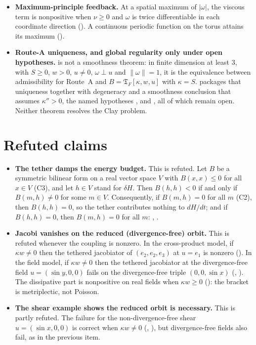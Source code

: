 \documentclass[11pt]{article}
\begin{document}
\begin{itemize}
\item \textbf{Maximum-principle feedback.} At a spatial maximum of $|\omega|$, the viscous term is nonpositive when $\nu\ge0$ and $\omega$ is twice differentiable in each coordinate direction (). A continuous periodic function on the torus attains its maximum ().
\item \textbf{Route-A uniqueness, and global regularity only under open hypotheses.}  is not a smoothness theorem: in finite dimension at least $3$, with $S\ge0$, $w>0$, $u\neq0$, $\omega\perp u$ and $\|\omega\|=1$, it is the equivalence between admissibility for Route~A and $B=\mathfrak{T}_F[\kappa,w,u]$ with $\kappa=S$.  packages that uniqueness together with degeneracy and a smoothness conclusion that assumes $\kappa''>0$, the named hypotheses ,  and , all of which remain open. Neither theorem resolves the Clay problem.
\end{itemize}

\section{Refuted claims}
\begin{itemize}
\item \textbf{The tether damps the energy budget.} This is refuted. Let $B$ be a symmetric bilinear form on a real vector space $V$ with $B(x,x)\le0$ for all $x\in V$ (C3), and let $h\in V$ stand for $\delta H$. Then $B(h,h)<0$ if and only if $B(m,h)\neq0$ for some $m\in V$. Consequently, if $B(m,h)=0$ for all $m$ (C2), then $B(h,h)=0$, so the tether contributes nothing to $dH/dt$; and if $B(h,h)=0$, then $B(m,h)=0$ for all $m$: , .
\item \textbf{Jacobi vanishes on the reduced (divergence-free) orbit.} This is refuted whenever the coupling is nonzero. In the cross-product model, if $\kappa w\neq0$ then the tethered jacobiator of $(e_2,e_2,e_3)$ at $u=e_1$ is nonzero (). In the field model, if $\kappa w\neq0$ then the tethered jacobiator at the divergence-free field $u=(\sin y,0,0)$ fails on the divergence-free triple $(0,0,\sin x)$ (, ). The dissipative part is nonpositive on real fields when $\kappa w\ge0$ (): the bracket is metriplectic, not Poisson.
\item \textbf{The shear example shows the reduced orbit is necessary.} This is partly refuted. The failure for the non-divergence-free shear $u=(\sin x,0,0)$ is correct when $\kappa w\neq0$ (, ), but divergence-free fields also fail, as in the previous item.
\end{itemize}
\end{document}
